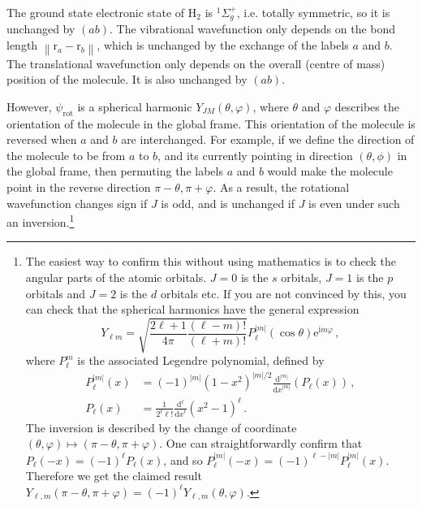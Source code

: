 \documentclass{article}
\theoremstyle{plain}\theoremheaderfont{\normalfont\itshape}\theorembodyfont{\rmfamily}\theoremseparator{.}\newtheorem*{rem}{Remark}\newtheorem*{ex}{Example}\newtheorem*{proof}{Proof}\newtheorem*{altp}{Alternative proof}
\theoremstyle{plain}\theoremheaderfont{\normalfont\bfseries}\theorembodyfont{\rmfamily}\theoremseparator{.}\newtheorem{thm}{Theorem}[section]\newtheorem{lem}[thm]{Lemma}\newtheorem{prop}[thm]{Proposition}\newtheorem*{cor}{Corollary}\newtheorem{defn}[thm]{Definition}\newtheorem{clm}[thm]{Claim}\newtheorem{clminproof}{Claim}\newtheorem*{law}{Law}\newtheorem{pos}[thm]{Postulate}
\theoremstyle{break}\theoremheaderfont{\normalfont\itshape}\theorembodyfont{\rmfamily}\theoremseparator{.\medskip}\newtheorem*{proofskip}{Proof}\newtheorem*{exs}{Examples}\newtheorem*{rems}{Remarks}
\theoremstyle{break}\theoremheaderfont{\normalfont\bfseries}\theorembodyfont{\rmfamily}\theoremseparator{.\medskip}\newtheorem{lemskip}[thm]{Lemma}\newtheorem{defnskip}[thm]{Definition}\newtheorem{propskip}[thm]{Proposition}\newtheorem{thmskip}[thm]{Theorem}
\numberwithin{equation}{section}
\newcommand{\ii}{\mathrm{i}}
\newcommand{\ee}{\mathrm{e}}
\newcommand{\dv}[3][]{\frac{\mathrm{d}^{#1} #2}{{\mathrm{d} #3}^{#1}}}
\newcommand{\vb}[1]{\bm{\mathrm{#1}}}
\newcommand{\abs}[1]{\left| #1 \right|}
\newcommand{\norm}[1]{\left\| #1 \right\|}
\begin{document}
    The ground state electronic state of \(\mathrm{H}_2\) is \(^1\Sigma_g^+\), i.e. totally symmetric, so it is unchanged by \((ab)\). The vibrational wavefunction only depends on the bond length \(\norm{\vb{r}_a-\vb{r}_b}\), which is unchanged by the exchange of the labels \(a\) and \(b\). The translational wavefunction only depends on the overall (centre of mass) position of the molecule. It is also unchanged by \((ab)\).
    
    However, \(\psi_{\text{rot}}\) is a spherical harmonic \(Y_{JM}(\theta,\varphi)\), where \(\theta\) and \(\varphi\) describes the orientation of the molecule in the global frame. This orientation of the molecule is reversed when \(a\) and \(b\) are interchanged. For example, if we define the direction of the molecule to be from \(a\) to \(b\), and its currently pointing in direction \((\theta,\phi)\) in the global frame, then permuting the labels \(a\) and \(b\) would make the molecule point in the reverse direction \(\pi-\theta,\pi+\varphi\). As a result, the rotational wavefunction changes sign if \(J\) is odd, and is unchanged if \(J\) is even under such an inversion.\footnote{The easiest way to confirm this without using mathematics is to check the angular parts of the atomic orbitals. \(J=0\) is the \(s\) orbitals, \(J=1\) is the \(p\) orbitals and \(J=2\) is the \(d\) orbitals etc. If you are not convinced by this, you can check that the spherical harmonics have the general expression
    \begin{equation}
        Y_{\ell m}=\sqrt{\frac{2\ell+1}{4\pi}\frac{(\ell-m)!}{(\ell+m)!}}P_\ell^{\abs{m}}(\cos\theta)\ee^{\ii m\varphi}\,,
    \end{equation}
    where \(P_\ell^m\) is the associated Legendre polynomial, defined by
    \begin{align}
        P_\ell^{\abs{m}}(x)&=(-1)^{\abs{m}}(1-x^2)^{\abs{m}/2}\dv[\abs{m}]{}{x}(P_\ell (x))\,,\\
        P_\ell(x)&=\frac{1}{2^\ell \ell!}\dv[\ell]{}{x}(x^2-1)^\ell\,.
    \end{align}
    The inversion is described by the change of coordinate \((\theta,\varphi)\mapsto(\pi-\theta,\pi+\varphi)\). One can straightforwardly confirm that \(P_\ell(-x)=(-1)^\ell P_\ell(x)\), and so \(P_\ell^{\abs{m}}(-x)=(-1)^{\ell-\abs{m}}P_\ell^{\abs{m}}(x)\). Therefore we get the claimed result \(Y_{\ell,m}(\pi-\theta,\pi+\varphi)=(-1)^{\ell}Y_{\ell,m}(\theta,\varphi)\).}
\end{document}
